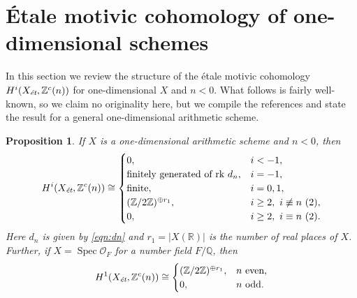 \documentclass{article}
\DeclareMathOperator{\Spec}{Spec}
\newcommand{\QQ}{\mathbb{Q}}
\newcommand{\RR}{\mathbb{R}}
\newcommand{\ZZ}{\mathbb{Z}}
\newcommand{\et}{\text{\it \'{e}t}}
\theoremstyle{myplain}
\newtheorem{proposition}[theorem]{Proposition}
\theoremstyle{mydefinition}
\begin{document}
\section{\'{E}tale motivic cohomology of one-dimensional schemes}
\label{sec:etale-motivic-cohomology}

In this section we review the structure of the \'{e}tale motivic cohomology
$H^i (X_\et, \ZZ^c(n))$ for one-dimensional $X$ and $n < 0$. What follows is
fairly well-known, so we claim no originality here, but we compile the
references and state the result for a general one-dimensional arithmetic scheme.

\begin{proposition}
  \label{prop:structure-of-motivic-cohomology}
  If $X$ is a one-dimensional arithmetic scheme and $n < 0$, then
  \begin{equation}
    \label{eqn:structure-of-motivic-cohomology}
    H^i (X_\et, \ZZ^c (n)) \cong
    \begin{cases}
      0, & i < -1, \\
      \text{finitely generated of rk } d_n, & i = -1, \\
      \text{finite}, & i = 0,1, \\
      (\ZZ/2\ZZ)^{\oplus r_1}, & i \ge 2, ~ i\not\equiv n ~ (2), \\
      0, & i \ge 2, ~ i\equiv n ~ (2).
    \end{cases}
  \end{equation}
  Here $d_n$ is given by \eqref{eqn:dn} and $r_1 = |X (\RR)|$ is the number of
  real places of $X$. Further, if $X = \Spec \mathcal{O}_F$ for a number field
  $F/\QQ$, then
  \begin{equation}
    \label{eqn:2-torsion-in-H1-Zc-for-Spec-OF}
    H^1 (X_\et, \ZZ^c (n)) \cong
    \begin{cases}
      (\ZZ/2\ZZ)^{\oplus r_1}, & n\text{ even}, \\
      0, & n \text{ odd}.
    \end{cases}
  \end{equation}
\end{proposition}
\end{document}
